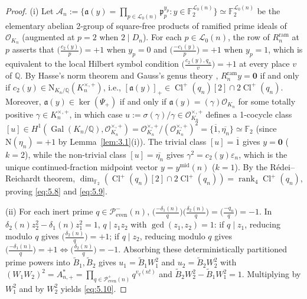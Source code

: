 \documentclass[11pt,reqno]{amsart}
\theoremstyle{remark}
\numberwithin{equation}{section}
\newcommand{\Q}{\mathbb{Q}}
\newcommand{\F}{\mathbb{F}}
\newcommand{\Peven}{\mathcal{P}_{\mathrm{even}}}
\DeclareMathOperator{\Gal}{Gal}
\DeclareMathOperator{\Cl}{Cl}
\DeclareMathOperator{\rank}{rank}
\begin{document}
\begin{proof}
(i) Let $\mathcal{A}_n := \{\mathfrak{a}(y) = \prod_{p \in \mathcal{L}_0(n)} \mathfrak{p}_p^{y_p} : y \in \F_2^{\mathcal{L}_0(n)}\} \simeq \F_2^{\mathcal{L}_0(n)}$ be the elementary abelian 2-group of square-free products of ramified prime ideals of $\mathcal{O}_{K_n}$ (augmented at $p = 2$ when $2 \mid D_n$). For each $p \in \mathcal{L}_0(n)$, the row of $R_n^{\mathrm{ram}}$ at $p$ asserts that $\bigl(\frac{c_2(y)}{p}\bigr) = +1$ when $y_p = 0$ and $\bigl(\frac{-c_1(y)}{p}\bigr) = +1$ when $y_p = 1$, which is equivalent to the local Hilbert symbol condition $\bigl(\frac{c_2(y), q_n}{v}\bigr) = +1$ at every place $v$ of $\Q$. By Hasse's norm theorem and Gauss's genus theory \cite{Gauss1801}, $R_n^{\mathrm{ram}} y = \mathbf{0}$ if and only if $c_2(y) \in \mathrm{N}_{K_n/\Q}(K_n^{\times,+})$, i.e., $[\mathfrak{a}(y)]_+ \in \Cl^+(q_n)[2] \cap 2\Cl^+(q_n)$. Moreover, $\mathfrak{a}(y) \in \ker(\Psi_+)$ if and only if $\mathfrak{a}(y) = (\gamma)\mathcal{O}_{K_n}$ for some totally positive $\gamma \in K_n^{\times,+}$, in which case $u := \sigma(\gamma)/\gamma \in \mathcal{O}_{K_n}^{\times,+}$ defines a 1-cocycle class $[u] \in H^1(\Gal(K_n/\Q), \mathcal{O}_{K_n}^{\times,+}) = \mathcal{O}_{K_n}^{\times,+}/(\mathcal{O}_{K_n}^{\times,+})^2 = \{\overline{1}, \overline{\eta_n}\} \simeq \F_2$ (since $\mathrm{N}(\eta_n) = +1$ by Lemma~\ref{lem:3.1}(i)). The trivial class $[u] = \overline{1}$ gives $y = \mathbf{0}$ ($k = 2$), while the non-trivial class $[u] = \overline{\eta_n}$ gives $\gamma^2 = c_2(y)\varepsilon_n$, which is the unique continued-fraction midpoint vector $y = y^{\mathrm{mid}}(n)$ ($k = 1$). By the R\'edei--Reichardt theorem, $\dim_{\F_2}(\Cl^+(q_n)[2] \cap 2\Cl^+(q_n)) = \rank_4 \Cl^+(q_n)$, proving \eqref{eq:5.8} and \eqref{eq:5.9}.

(ii) For each inert prime $q \in \Peven^-(n)$, $\bigl(\frac{-\delta_1(n)}{q}\bigr)\bigl(\frac{\delta_2(n)}{q}\bigr) = \bigl(\frac{-q_n}{q}\bigr) = -1$. In $\delta_2(n)z_2^2 - \delta_1(n)z_1^2 = 1$, $q \mid z_1 z_2$ with $\gcd(z_1, z_2) = 1$: if $q \mid z_1$, reducing modulo $q$ gives $\bigl(\frac{\delta_2(n)}{q}\bigr) = +1$; if $q \mid z_2$, reducing modulo $q$ gives $\bigl(\frac{-\delta_1(n)}{q}\bigr) = +1 \iff \bigl(\frac{\delta_2(n)}{q}\bigr) = -1$. Absorbing these deterministically partitioned prime powers into $\widetilde{B}_1, \widetilde{B}_2$ gives $u_1 = \widetilde{B}_1 W_1^2$ and $u_2 = \widetilde{B}_2 W_2^2$ with $(W_1 W_2)^2 = A_{n,+}^* = \prod_{q \in \Peven^+(n)} q^{v_q(n!)}$ and $\widetilde{B}_2 W_2^2 - \widetilde{B}_1 W_1^2 = 1$. Multiplying by $W_1^2$ and by $W_2^2$ yields \eqref{eq:5.10}.
\end{proof}
\end{document}
